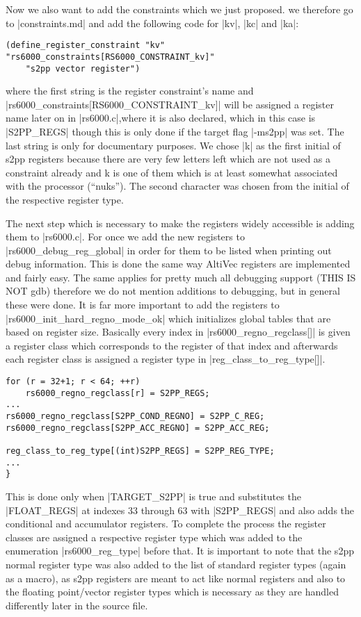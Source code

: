 Now we also want to add the constraints which we just proposed.
we therefore go to |constraints.md| and add the following code for |kv|, |kc| and |ka|:
\begin{lstlisting}
(define_register_constraint "kv" "rs6000_constraints[RS6000_CONSTRAINT_kv]"
    "s2pp vector register")
\end{lstlisting}
where the first string is the register constraint's name and |rs6000_constraints[RS6000_CONSTRAINT_kv]| will be assigned a register name later on in |rs6000.c|,where it is also declared, which in this case is |S2PP_REGS| though this is only done if the target flag |-ms2pp| was set.
The last string is only for documentary purposes.
We chose |k| as the first initial of s2pp registers because there are very few letters left which are not used as a constraint already and k is one of them which is at least somewhat associated with the processor (``nuks'').
The second character was chosen from the initial of the respective register type.

The next step which is necessary to make the registers widely accessible is adding them to |rs6000.c|.
For once we add the new registers to |rs6000_debug_reg_global| in order for them to be listed when printing out debug information.
This is done the same way AltiVec registers are implemented and fairly easy.
The same applies for pretty much all debugging support (THIS IS NOT gdb) therefore we do not mention additions to debugging, but in general these were done.
It is far more important to add the registers to |rs6000_init_hard_regno_mode_ok| which initializes global tables that are based on register size.
Basically every index in |rs6000_regno_regclass[]| is given a register class which corresponds to the register of that index and afterwards each register class is assigned a register type in |reg_class_to_reg_type[]|.
\begin{lstlisting}
for (r = 32+1; r < 64; ++r)
    rs6000_regno_regclass[r] = S2PP_REGS;
...
rs6000_regno_regclass[S2PP_COND_REGNO] = S2PP_C_REG;
rs6000_regno_regclass[S2PP_ACC_REGNO] = S2PP_ACC_REG;

reg_class_to_reg_type[(int)S2PP_REGS] = S2PP_REG_TYPE;
...
}
\end{lstlisting}

This is done only when |TARGET_S2PP| is true and substitutes the |FLOAT_REGS| at indexes 33 through 63 with |S2PP_REGS| and also adds the conditional and accumulator registers.
To complete the process the register classes are assigned a respective register type which was added to the enumeration |rs6000_reg_type| before that.
It is important to note that the s2pp normal register type was also added to the list of standard register types (again as a macro), as s2pp registers are meant to act like normal registers and also to the floating point/vector register types which is necessary as they are handled differently later in the source file.

